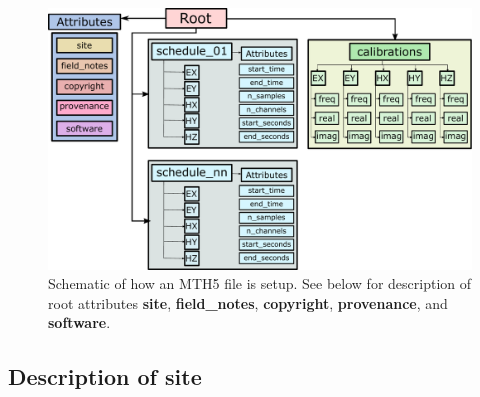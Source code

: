 \documentclass{article}
\newcommand{\attr}[1]{\textbf{#1}}
\begin{document}
\begin{figure}[!htb]
	\centering
	\includegraphics[width=.99\textwidth]{mth5_flowchart.pdf}
	\caption{Schematic of how an MTH5 file is setup.  See below for description of root attributes \attr{site}, \attr{field\_notes}, \attr{copyright}, \attr{provenance}, and \attr{software}.}
	\label{fig:flowchar}
\end{figure}

\subsection{Description of \textbf{site}}
\end{document}

